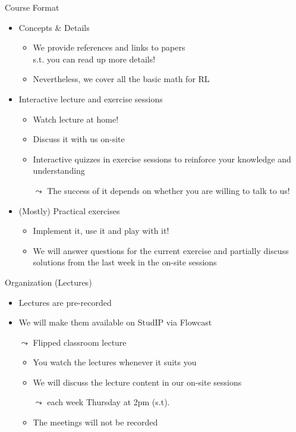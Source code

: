 \documentclass[aspectratio=169]{../latex_main/tntbeamer}  %
\begin{document}
\begin{frame}[c]{Course Format}
	
	\begin{itemize}
		\item Concepts \& Details
		\begin{itemize}
			\item We provide references and links to papers\\ s.t. you can read up more details! 
			\item Nevertheless, we cover all the basic math for RL
		\end{itemize}
		\smallskip
		\item Interactive lecture and exercise sessions
		\begin{itemize}
		    \item Watch lecture at home!
		    \item Discuss it with us on-site
			\item Interactive quizzes in exercise sessions to reinforce your knowledge and understanding
			\item[$\leadsto$] The success of it depends on whether you are willing to talk to us! 
		\end{itemize}
		\smallskip
		\item (Mostly) Practical exercises
		\begin{itemize}
			\item Implement it, use it and play with it!
			\item We will answer questions for the current exercise and partially discuss solutions from the last week in the on-site sessions
		\end{itemize}
	\end{itemize}
	
\end{frame}

\begin{frame}[c]{Organization (Lectures)}
	
	\begin{itemize}
		\item Lectures are pre-recorded
		\item We will make them available on StudIP via Flowcast
		\item[$\leadsto$] Flipped classroom lecture
		\begin{itemize}
		    \item You watch the lectures whenever it suits you
		    \item We will discuss the lecture content in our on-site sessions
		    \item[$\leadsto$] each week Thursday at 2pm (s.t).
		    \item The meetings will not be recorded
		\end{itemize}
	\end{itemize}
	
\end{frame}
\end{document}
